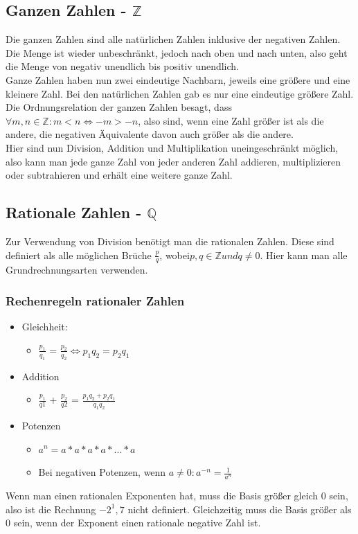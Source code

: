 \documentclass{article}
\newcommand{\Z}{\mathbb{Z}}
\newcommand{\Q}{\mathbb{Q}}
\begin{document}
	\subsection{Ganzen Zahlen - \texorpdfstring{$\Z$}{}}
	Die ganzen Zahlen sind alle natürlichen Zahlen inklusive der negativen Zahlen. Die Menge ist wieder unbeschränkt, jedoch nach oben und nach unten, also geht die Menge von negativ unendlich bis positiv unendlich. \\
	Ganze Zahlen haben nun zwei eindeutige Nachbarn, jeweils eine größere und eine kleinere Zahl. Bei den natürlichen Zahlen gab es nur eine eindeutige größere Zahl. \\
	Die Ordnungsrelation der ganzen Zahlen besagt, dass $\forall m, n \in \Z : m<n \iff -m > -n$, also sind, wenn eine Zahl größer ist als die andere, die negativen Äquivalente davon auch größer als die andere. \\
	Hier sind nun Division, Addition und Multiplikation uneingeschränkt möglich, also kann man jede ganze Zahl von jeder anderen Zahl addieren, multiplizieren oder subtrahieren und erhält eine weitere ganze Zahl.
	\subsection{Rationale Zahlen - \texorpdfstring{$\Q$}{}}
	Zur Verwendung von Division benötigt man die rationalen Zahlen. Diese sind definiert als alle möglichen Brüche $\frac{p}{q}$, wobei$p,q \in \Z und q \neq 0$. Hier kann man alle Grundrechnungsarten verwenden.
	\subsubsection{Rechenregeln rationaler Zahlen}
	\begin{itemize}
		\item{Gleichheit:}
		\begin{itemize}
			\item{$\frac{p_1}{q_1}$ = $\frac{p_2}{q_2} \iff p_1q_2 = p_2q_1$}
		\end{itemize}
		\item{Addition}
		\begin{itemize}
			\item{$\frac{p_1}{q1}$ + $\frac{p_2}{q2}$ = $\frac{p_1q_2+p_2q_1}{q_1q_2}$}
		\end{itemize}
		\item{Potenzen}
		\begin{itemize}
			\item{$a^n = a*a*a*a*...*a$}
			\item{Bei negativen Potenzen, wenn $a \neq 0: a^{-n} = \frac{1}{a^n}$}
		\end{itemize}
	\end{itemize}
	Wenn man einen rationalen Exponenten hat, muss die Basis größer gleich 0 sein, also ist die Rechnung $-2^1,7$ nicht definiert. Gleichzeitig muss die Basis größer als 0 sein, wenn der Exponent einen rationale negative Zahl ist.
\end{document}
